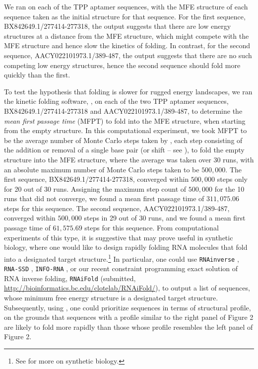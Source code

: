 We ran \fftbor on each of the TPP \rb aptamer
sequences, with the MFE structure of each
sequence taken as the initial structure \strSt for that sequence.  For the
first sequence, BX842649.1/277414-277318, the \fftbor output
suggests that there are low energy structures
at a distance from the MFE structure, which might compete with the MFE
structure and hence slow the kinetics of folding. In contrast, for the
second sequence, AACY022101973.1/389-487, the \fftbor output suggests
that there are no such competing low energy structures, hence
the second sequence should fold more quickly than the first.

To test the hypothesis that folding is slower for rugged energy landscapes,
we ran the kinetic folding software, \kinfold \citep{flamm},
on each of the two TPP \rb aptamer sequences,
BX842649.1/277414-277318 and AACY022101973.1/389-487,
to determine the {\em mean first passage time} (MFPT) to
fold into the MFE structure, when starting from the empty structure.
In this computational
experiment, we took MFPT to be the average number of Monte Carlo steps
taken by \kinfold, each step consisting of the addition or removal
of a single base pair (or shift -- see \citep{flamm}), to fold the
empty structure into the MFE
structure, where the average was taken over $30$ runs, with an absolute
maximum number of Monte Carlo steps taken to be $500,000$.
The first sequence, BX842649.1/277414-277318, converged within $500,000$
steps only for 20 out of 30 runs. Assigning the maximum step count of
$500,000$ for the 10 runs that did not converge, we found a mean first
passage time of $311,075.06$ steps for this sequence.
The second sequence, AACY022101973.1/389-487, converged within $500,000$
steps in 29 out of 30 runs, and we found a mean first passage time of
$61,575.69$ steps for this sequence. From computational experiments of this
type, it is suggestive that \fftbor may prove useful in synthetic
biology,
where one would like to design rapidly folding RNA molecules that
fold into a designated target structure.\footnote{See
\citep{Shetty.jbe08,Knight.msb05,Waldminghaus.bc08,Zadeh.jcc11} for more
on synthetic biology.} In particular, one could use
{\tt RNAinverse} \citep{hofacker:ViennaWebServer},
{\tt RNA-SSD} \citep{Andronescu04},
{\tt INFO-RNA} \citep{Busch06},
or our recent constraint programming exact
solution of RNA inverse folding, {\tt RNAiFold}
(submitted, \url{http://bioinformatics.bc.edu/clotelab/RNAiFold/}),
to output a list of sequences,
whose minimum free energy structure is a designated target structure.
Subsequently, using \fftbor, one could prioritize sequences in terms
of \fftbor structural profile, on the grounds that sequences with a profile
similar to the right panel of Figure 2
are likely to fold more rapidly than those whose profile resembles
the left panel of Figure 2.

